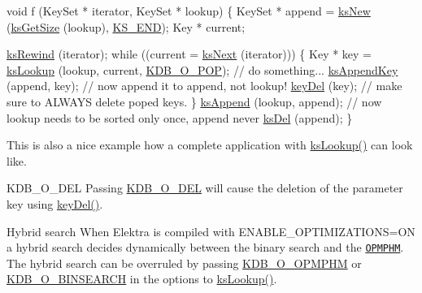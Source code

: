 \begin{DoxyCodeInclude}
\textcolor{keywordtype}{void} f (KeySet * iterator, KeySet * lookup)
\{
        KeySet * append = \hyperlink{group__keyset_ga671e1aaee3ae9dc13b4834a4ddbd2c3c}{ksNew} (\hyperlink{group__keyset_ga7474ad6b0a0fa969dbdf267ba5770eee}{ksGetSize} (lookup), \hyperlink{group__keyset_ga7a28fce3773b2c873c94ac80b8b4cd54}{KS\_END});
        Key * current;

        \hyperlink{group__keyset_gabe793ff51f1728e3429c84a8a9086b70}{ksRewind} (iterator);
        \textcolor{keywordflow}{while} ((current = \hyperlink{group__keyset_ga317321c9065b5a4b3e33fe1c399bcec9}{ksNext} (iterator)))
        \{
                Key * key = \hyperlink{group__keyset_ga60f1ddcf23272f2b29b90e92ebe9b56f}{ksLookup} (lookup, current, \hyperlink{group__keyset_ggada05f4bbf46fde81d0d57df86e73d914a52fb5f2cc86773d393da62bebebf7984}{KDB\_O\_POP});
                \textcolor{comment}{// do something...}
                \hyperlink{group__keyset_gaa5a1d467a4d71041edce68ea7748ce45}{ksAppendKey} (append, key); \textcolor{comment}{// now append it to append, not lookup!}
                \hyperlink{group__key_ga3df95bbc2494e3e6703ece5639be5bb1}{keyDel} (key);                \textcolor{comment}{// make sure to ALWAYS delete poped keys.}
        \}
        \hyperlink{group__keyset_ga21eb9c3a14a604ee3a8bdc779232e7b7}{ksAppend} (lookup, append);
        \textcolor{comment}{// now lookup needs to be sorted only once, append never}
        \hyperlink{group__keyset_ga27e5c16473b02a422238c8d970db7ac8}{ksDel} (append);
\}
\end{DoxyCodeInclude}
 This is also a nice example how a complete application with \hyperlink{group__keyset_ga60f1ddcf23272f2b29b90e92ebe9b56f}{ks\+Lookup()} can look like.

\begin{DoxyParagraph}{K\+D\+B\+\_\+\+O\+\_\+\+D\+EL}
Passing \hyperlink{group__keyset_ggada05f4bbf46fde81d0d57df86e73d914a66a5380c120f25f28f49848c4a863ead}{K\+D\+B\+\_\+\+O\+\_\+\+D\+EL} will cause the deletion of the parameter {\ttfamily key} using \hyperlink{group__key_ga3df95bbc2494e3e6703ece5639be5bb1}{key\+Del()}.
\end{DoxyParagraph}
\begin{DoxyParagraph}{Hybrid search}
When Elektra is compiled with {\ttfamily E\+N\+A\+B\+L\+E\+\_\+\+O\+P\+T\+I\+M\+I\+Z\+A\+T\+I\+O\+NS=ON} a hybrid search decides dynamically between the binary search and the \href{https://master.libelektra.org/doc/dev/data-structures.md#order-preserving-minimal-perfect-hash-map-aka-opmphm}{\tt O\+P\+M\+P\+HM}. The hybrid search can be overruled by passing \hyperlink{group__proposal_gga93673533c4c8eb1fdfca76b98c5f49b0afe9f6ff6e374540baf600a918b07ee6e}{K\+D\+B\+\_\+\+O\+\_\+\+O\+P\+M\+P\+HM} or \hyperlink{group__proposal_gga93673533c4c8eb1fdfca76b98c5f49b0ac67a43bd273203575090d26010f6c995}{K\+D\+B\+\_\+\+O\+\_\+\+B\+I\+N\+S\+E\+A\+R\+CH} in the options to \hyperlink{group__keyset_ga60f1ddcf23272f2b29b90e92ebe9b56f}{ks\+Lookup()}.
\end{DoxyParagraph}

